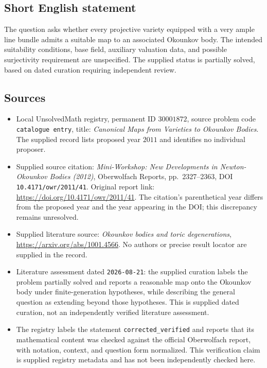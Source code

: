 \documentclass[11pt]{article}
\begin{document}
\subsection{Short English statement}
The question asks whether every projective variety equipped with a very ample line bundle admits a suitable map to an associated Okounkov body. The intended suitability conditions, base field, auxiliary valuation data, and possible surjectivity requirement are unspecified. The supplied status is partially solved, based on dated curation requiring independent review.
\subsection{Sources}
\begin{itemize}
\item Local UnsolvedMath registry, permanent ID \(30001872\), source problem code \texttt{catalogue entry}, title: \emph{Canonical Maps from Varieties to Okounkov Bodies}. The supplied record lists proposed year \(2011\) and identifies no individual proposer.
\item Supplied source citation: \emph{Mini-Workshop: New Developments in Newton-Okounkov Bodies (2012)}, Oberwolfach Reports, pp.~2327--2363, DOI \texttt{10.4171/owr/2011/41}. Original report link: \url{https://doi.org/10.4171/owr/2011/41}. The citation's parenthetical year differs from the proposed year and the year appearing in the DOI; this discrepancy remains unresolved.
\item Supplied literature source: \emph{Okounkov bodies and toric degenerations}, \url{https://arxiv.org/abs/1001.4566}. No authors or precise result locator are supplied in the record.
\item Literature assessment dated \texttt{2026-08-21}: the supplied curation labels the problem partially solved and reports a reasonable map onto the Okounkov body under finite-generation hypotheses, while describing the general question as extending beyond those hypotheses. This is supplied dated curation, not an independently verified literature assessment.
\item The registry labels the statement \texttt{corrected\_verified} and reports that its mathematical content was checked against the official Oberwolfach report, with notation, context, and question form normalized. This verification claim is supplied registry metadata and has not been independently checked here.
\end{itemize}
\end{document}
